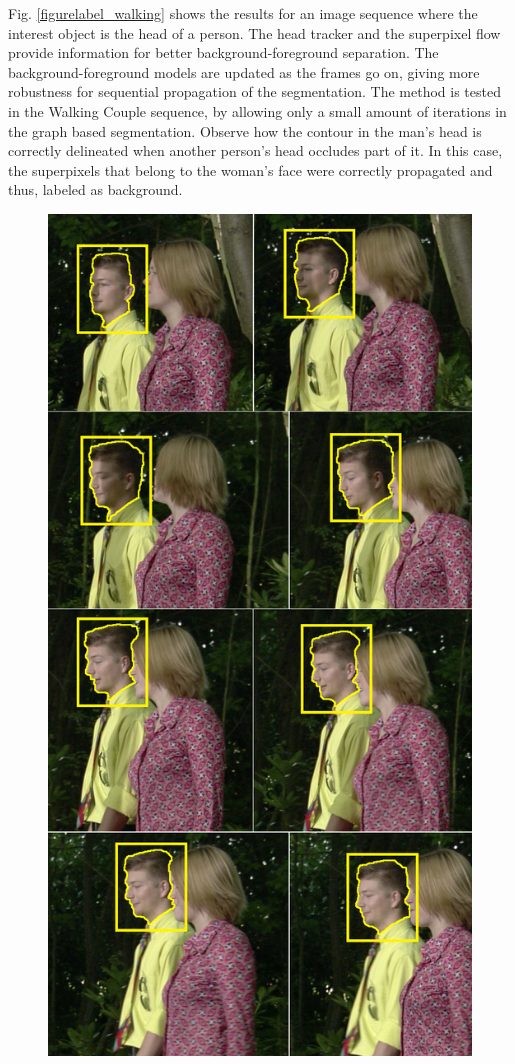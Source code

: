 Fig. \ref{figurelabel_walking} shows the results for an image sequence where the interest object is the head of a person.
The head tracker and the superpixel flow provide information for better background-foreground separation. The
background-foreground models are updated as the frames go on, giving more robustness for sequential
propagation of the segmentation. The method is tested in the Walking Couple sequence, by allowing only a small amount of iterations in the
graph based segmentation. Observe how the contour in the man's head is correctly delineated when
another person's head occludes part of it. In this case, the superpixels that belong to the woman’s face
were correctly propagated and thus, labeled as background. \\
   \begin{figure}[thpb]
      \centering
      \includegraphics[height=0.75\textheight]{images/Sequence2.png}

\end{figure}
